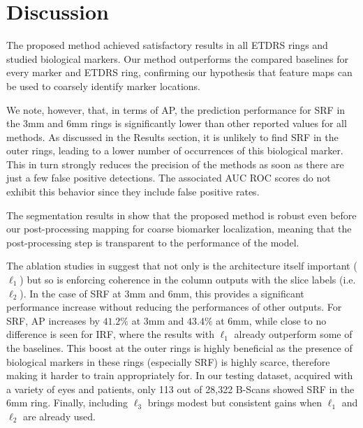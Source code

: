 \section{Discussion}

The proposed method achieved satisfactory results in all ETDRS rings and studied biological markers. Our method outperforms the compared baselines for every marker and ETDRS ring, confirming our hypothesis that feature maps can be used to coarsely identify marker locations.

We note, however, that, in terms of AP, the prediction performance for SRF in the 3mm and 6mm rings is significantly lower than other reported values for all methods. As discussed in the Results section, it is unlikely to find SRF in the outer rings, leading to a lower number of occurrences of this biological marker. This in turn strongly reduces the precision of the methods as soon as there are just a few false positive detections. The associated AUC ROC scores do not exhibit this behavior since they include false positive rates.

The segmentation results in  show that the proposed method is robust even before our post-processing mapping for coarse biomarker localization, meaning that the post-processing step is transparent to the performance of the model. 

The ablation studies in  suggest that not only is the architecture itself important ($\ell_1$) but so is enforcing coherence in the column outputs with the slice labels (i.e. $\ell_2$). In the case of SRF at 3mm and 6mm, this provides a significant performance increase without reducing the performances of other outputs. For SRF, AP increases by $41.2\%$ at 3mm and $43.4\%$ at 6mm, while close to no difference is seen for IRF, where the results with $\ell_1$ already outperform some of the baselines. This boost at the outer rings is highly beneficial as the presence of biological markers in these rings (especially SRF) is highly scarce, therefore making it harder to train appropriately for. In our testing dataset, acquired with a variety of eyes and patients, only 113 out of 28,322 B-Scans showed SRF in the 6mm ring. Finally, including $\ell_3$ brings modest but consistent gains when $\ell_1$ and $\ell_2$ are already used.


